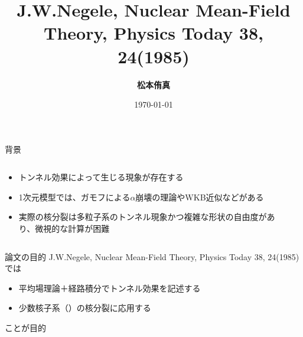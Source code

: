 \documentclass[14pt,aspectratio=169,xcolor=dvipsnames,table,dvipdfmx]{beamer}
\title{J.W.Negele, Nuclear Mean-Field Theory, Physics Today 38, 24(1985)}
\author{\textbf{松本侑真}}
\date{\today}
\institute{原子核理論 関澤研究室}
\theoremstyle{definition}
\begin{document}
\maketitle




\begin{frame}{背景}
  \begin{columns}[t]
    \begin{column}{.5\textwidth}
      \begin{itemize}
        \item トンネル効果によって生じる現象が存在する
        \item 1次元模型では、ガモフによる$\alpha$崩壊の理論やWKB近似などがある
        \item 実際の核分裂は多粒子系のトンネル現象かつ複雑な形状の自由度があり、微視的な計算が困難
      \end{itemize}
    \end{column}
    \begin{column}{.5\textwidth}
    \end{column}
  \end{columns}
\end{frame}

\begin{frame}{論文の目的}
  J.W.Negele, Nuclear Mean-Field Theory, Physics Today 38, 24(1985)では
  \begin{itemize}
    \item 平均場理論＋経路積分でトンネル効果を記述する
    \item 少数核子系（）の核分裂に応用する
  \end{itemize}
  ことが目的
\end{frame}
\end{document}

